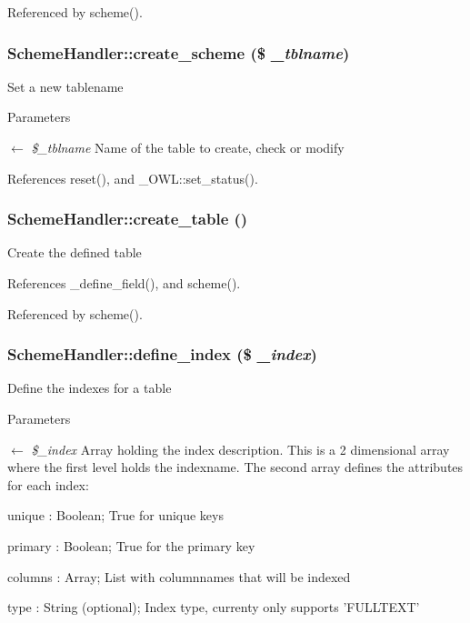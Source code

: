 Referenced by scheme().

\subsubsection[{create\_\-scheme}]{\setlength{\rightskip}{0pt plus 5cm}SchemeHandler::create\_\-scheme (\$ {\em \_\-tblname})}\label{classSchemeHandler_ae00497936108b220b41af512774cfc16}
Set a new tablename 
\begin{DoxyParams}{Parameters}
\item[\mbox{$\leftarrow$} {\em \$\_\-tblname}]Name of the table to create, check or modify \end{DoxyParams}


References reset(), and \_\-OWL::set\_\-status().

\subsubsection[{create\_\-table}]{\setlength{\rightskip}{0pt plus 5cm}SchemeHandler::create\_\-table ()}\label{classSchemeHandler_a87f623cc6ac1e44576d2415e36804218}
Create the defined table 

References \_\-define\_\-field(), and scheme().



Referenced by scheme().

\subsubsection[{define\_\-index}]{\setlength{\rightskip}{0pt plus 5cm}SchemeHandler::define\_\-index (\$ {\em \_\-index})}\label{classSchemeHandler_a92adefff835050da61337524b9ae907b}
Define the indexes for a table 
\begin{DoxyParams}{Parameters}
\item[\mbox{$\leftarrow$} {\em \$\_\-index}]Array holding the index description. This is a 2 dimensional array where the first level holds the indexname. The second array defines the attributes for each index:
\begin{DoxyItemize}
\item unique : Boolean; True for unique keys
\item primary : Boolean; True for the primary key
\item columns : Array; List with columnnames that will be indexed
\item type : String (optional); Index type, currenty only supports 'FULLTEXT' 
\end{DoxyItemize}\end{DoxyParams}


